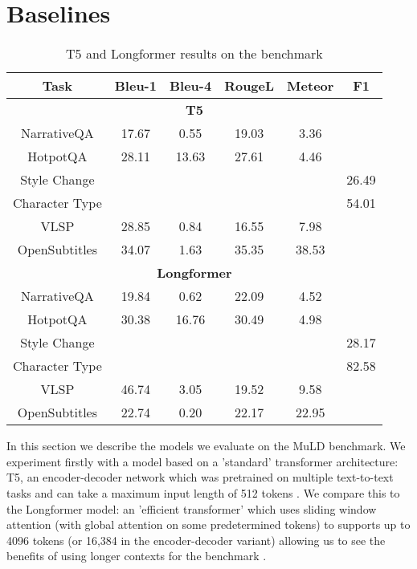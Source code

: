 \documentclass[10pt, a4paper]{article}
\begin{document}
\section{Baselines}
\begin{table*}[]
    \centering
    \begin{tabular}{cccccc}
    \toprule
    Task     & Bleu-1 & Bleu-4 & RougeL & Meteor & F1\\
    \midrule
    \multicolumn{6}{c}{\textbf{T5}} \\
    \midrule
NarrativeQA & 17.67 & 0.55 & 19.03 & 3.36 \\
    HotpotQA & 28.11 &	13.63 &	27.61 &	4.46 \\
    Style Change & & & & &  26.49\\
    Character Type & & & & & 54.01\\
    VLSP & 28.85 &	0.84 &	16.55 &	7.98 \\
    OpenSubtitles & 34.07 &	1.63 &	35.35 &	38.53 \\
\midrule\midrule\multicolumn{6}{c}{\textbf{Longformer}} \\ \midrule
    NarrativeQA & 19.84 &	0.62 &	22.09 &	4.52 \\
    HotpotQA & 30.38 & 16.76 & 30.49 & 4.98 \\
    Style Change & & & & & 28.17\\
    Character Type  & & & & & 82.58 \\
    VLSP & 46.74 &	3.05 &	19.52 &	9.58 \\
    OpenSubtitles & 22.74 &	0.20 &	22.17 &	22.95\\


    \bottomrule
    \end{tabular}
    \caption{T5 and Longformer results on the benchmark}
    \label{tab:main_results}
\end{table*}




In this section we describe the models we evaluate on the MuLD benchmark. We experiment firstly with a model based on a 'standard' transformer architecture: T5, an encoder-decoder network which was pretrained on multiple text-to-text tasks and can take a maximum input length of 512 tokens \cite{Raffel_2020}. We compare this to the Longformer model: an 'efficient transformer' which uses sliding window attention (with global attention on some predetermined tokens) to supports up to 4096 tokens (or 16,384 in the encoder-decoder variant) allowing us to see the benefits of using longer contexts for the benchmark \cite{Beltagy_2020}.
\end{document}
